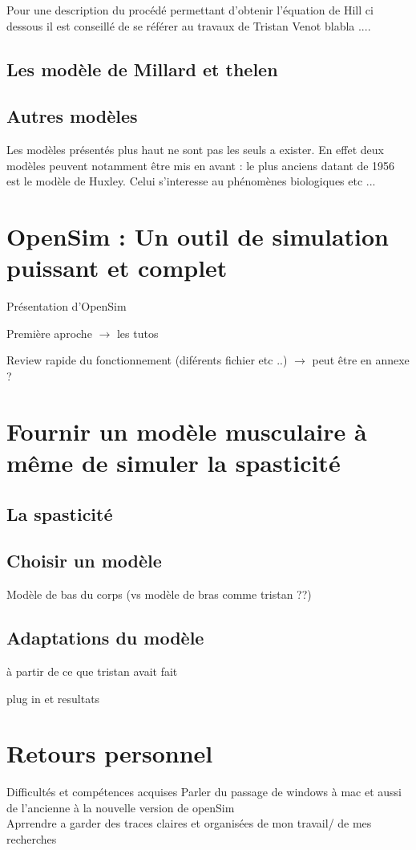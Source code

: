 Pour une description du procédé permettant d'obtenir l'équation de Hill ci dessous il est conseillé de se référer au travaux de Tristan Venot blabla .... 


\section{Les modèle de Millard et thelen}

\section{Autres modèles}
Les modèles présentés plus haut ne sont pas les seuls a exister. En effet deux modèles peuvent notamment être mis en avant : le plus anciens datant de 1956 est le modèle de Huxley. Celui s'interesse au phénomènes biologiques etc ... \cite{huxley_muscle_1957}
\chapter{OpenSim : Un outil de simulation puissant et complet}

Présentation d'OpenSim 

Première aproche $\rightarrow$ les tutos

Review rapide du fonctionnement (diférents fichier etc ..) $\rightarrow$ peut être en annexe ? 
\chapter{Fournir un modèle musculaire à même de simuler la spasticité}
\section{La spasticité}
\section{Choisir un modèle}
Modèle de bas du corps (vs modèle de bras comme tristan ??)
\section{Adaptations du modèle}
à partir de ce que tristan avait fait 

plug in et resultats 
\chapter{Retours personnel}
Difficultés et compétences acquises 
Parler du passage de windows à mac et aussi de l'ancienne à la nouvelle version de openSim \\

Aprrendre a garder des traces claires et organisées de mon travail/ de mes recherches 